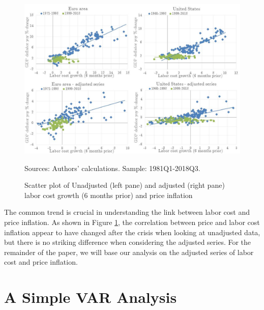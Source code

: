 \documentclass[11pt]{article}
\begin{document}
\begin{figure}[!htbp]
\begin{center}
\caption{Scatter plot of Unadjusted (left pane) and adjusted (right pane) labor cost growth (6 months prior) and price inflation}\label{fig:Scatter}
\includegraphics[scale = .75]{Chart_EAUS_scatter.jpg}

\begin{minipage}{0.92\textwidth} {\footnotesize
Sources: Authors' calculations.
Sample: 1981Q1-2018Q3.\par}
\end{minipage}
\end{center}
\end{figure}

The common trend is crucial in understanding the link between labor cost and price inflation. As shown in Figure \ref{fig:Scatter}, the correlation between price and labor cost inflation appear to have changed after the crisis when looking at unadjusted data, but there is no striking difference when considering the adjusted series. For the remainder of the paper, we will base our analysis on the adjusted series of labor cost and price inflation.


\section{A Simple VAR Analysis}
\label{Section:simpleVAR}
\end{document}
